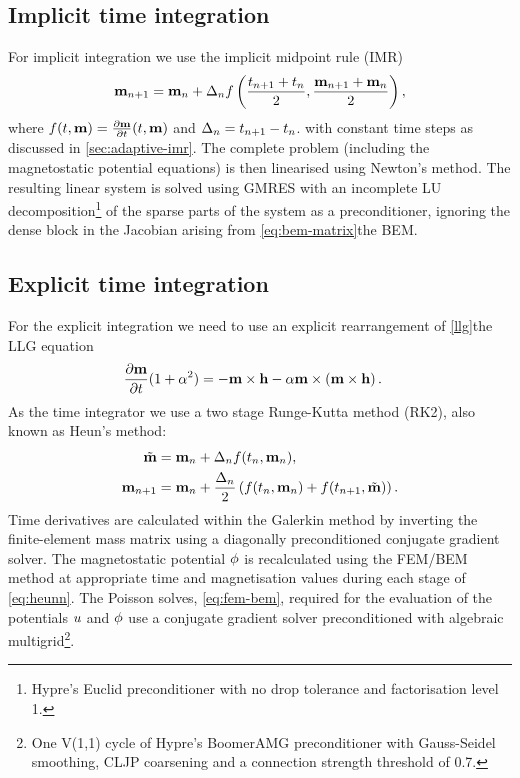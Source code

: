 \documentclass[10pt, final, conference, transmag]{IEEEtran}
\begin{document}
\subsection{Implicit time integration}
For implicit integration we use the implicit midpoint rule (IMR)
\iftransmagpaper
\cite{dAquino2005}
\begin{equation}
  \label{eq:imr}
  \begin{aligned}
    \mathbf{m}_{n+1} = \mathbf{m}_n + \Delta_{n} 
    f\left(
      \frac{t_{n+1} + t_n}{2}, \frac{\mathbf{m}_{n+1} + \mathbf{m}_n}{2}
    \right),
  \end{aligned}
\end{equation}
where $f(t, \mathbf{m}) = \frac{\partial \mathbf{m}}{\partial t}(t, \mathbf{m})$ and $\Delta_{n} = t_{n+1} - t_n$.
\else
with constant time steps as discussed in \autoref{sec:adaptive-imr}.
\fi
The complete problem (including the magnetostatic potential equations) is then linearised using Newton's method.
The resulting linear system is solved using GMRES with an incomplete LU decomposition\footnote{Hypre's Euclid preconditioner\cite{hypre} with no drop tolerance and factorisation level 1.} of the sparse parts of the system as a preconditioner, ignoring the dense block in the Jacobian arising from \iftransmagpaper\eqref{eq:bem-matrix}\else the BEM\fi.

\subsection{Explicit time integration}
For the explicit integration we need to use an explicit rearrangement \cite[181]{Aharoni1996} of \iftransmagpaper\eqref{llg}\else the LLG equation\fi
\begin{equation}
  \label{eq:ll}
  \begin{aligned}
    \frac{\partial \mathbf{m}}{\partial t} (1 + \alpha^2) &= - \mathbf{m} \times \mathbf{h} - \alpha \mathbf{m} \times \left( \mathbf{m} \times \mathbf{h} \right).
  \end{aligned}
\end{equation}
As the time integrator we use a two stage Runge-Kutta method (RK2), also known as Heun's method:
\begin{equation}
  \label{eq:heunn}
  \begin{aligned}
    \tilde{\mathbf{m}} &= \mathbf{m}_n + \Delta_{n} f(t_n, \mathbf{m}_n), \\
    \mathbf{m}_{n+1} &= \mathbf{m}_n + \frac{\Delta_{n}}{2} \left( f(t_n, \mathbf{m}_n) + f(t_{n+1},
      \tilde{\mathbf{m}}) \right).
  \end{aligned} 
\end{equation}
Time derivatives are calculated within the Galerkin method by inverting the finite-element mass matrix using a diagonally preconditioned conjugate gradient solver.
The magnetostatic potential $\phi$ is recalculated using the FEM/BEM method at appropriate time and magnetisation values during each stage of \eqref{eq:heunn}.
The Poisson solves\iftransmagpaper, \eqref{eq:fem-bem},\fi{} required for the evaluation of the potentials $u$ and $\phi$ use a conjugate gradient solver preconditioned with algebraic multigrid\footnote{One V(1,1) cycle of Hypre's BoomerAMG preconditioner\cite{hypre} with Gauss-Seidel smoothing, CLJP coarsening and a connection strength threshold of 0.7.}.
\end{document}
